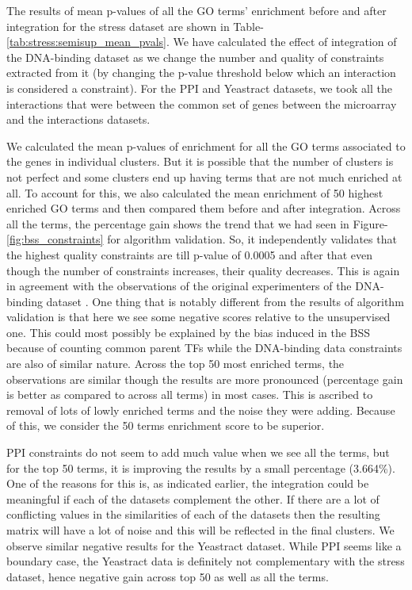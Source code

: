 The results of mean p-values of all the GO terms' enrichment before and after integration for the stress dataset are shown in Table-\ref{tab:stress:semisup_mean_pvals}. 
We have calculated the effect of integration of the DNA-binding dataset as we change the number and quality of constraints extracted from it (by changing the p-value threshold 
below which an interaction is considered a constraint). For the PPI and Yeastract datasets, we took all the interactions that were between the common set of genes 
between the microarray and the interactions datasets. 

We calculated the mean p-values of enrichment for all the GO terms associated to the genes in individual clusters. But it is possible that the number of 
clusters is not perfect and some clusters end up having terms that are not much enriched at all. To account for this, we also calculated the mean 
enrichment of 50 highest enriched GO terms and then compared them before and after integration. Across all the terms, the percentage gain 
shows the trend that we had seen in Figure-\ref{fig:bss_constraints} for algorithm validation. So, it independently validates that the highest quality 
constraints are till p-value of 0.0005 and after that even though the number of constraints increases, their quality decreases. This is again in agreement with 
the observations of the original experimenters of the DNA-binding dataset \citep{harbison04transcriptional}. One thing that is notably different from the results of 
algorithm validation is that here we see some negative scores relative to the unsupervised one. This could most possibly be explained by the bias induced in the 
BSS because of counting common parent TFs while the DNA-binding data constraints are also of similar nature. Across the top 50 most enriched terms, the 
observations are similar though the results are more pronounced (percentage gain is better as compared to across all terms) in most cases. This is 
ascribed to removal of lots of lowly enriched terms and the noise they were adding. Because of this, we consider the 50 terms enrichment score to be superior.

PPI constraints do not seem to add much value when we see all the terms, but for the top 50 terms, it is improving the results by a small percentage (3.664\%). 
One of the reasons for this is, as indicated earlier, the integration could be meaningful if each of the datasets complement the other. If there are 
a lot of conflicting values in the similarities of each of the datasets then the resulting matrix will have a lot of noise and this will be reflected in the final clusters. 
We observe similar negative results for the Yeastract dataset. While PPI seems like a boundary case, the Yeastract data is definitely not complementary with the stress dataset, 
hence negative gain across top 50 as well as all the terms. 

